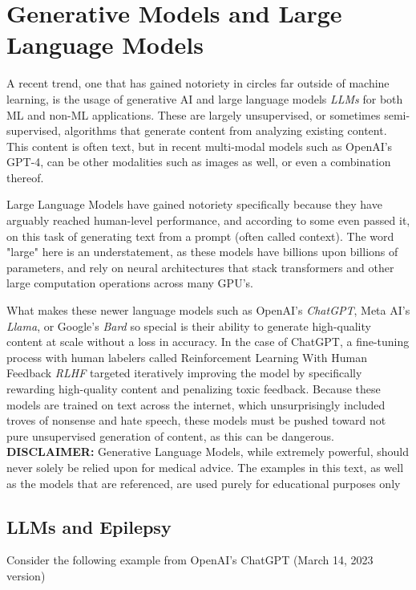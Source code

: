 
\section{Generative Models and Large Language Models}

A recent trend, one that has gained notoriety in circles far outside of machine learning, is the usage of generative AI
and large language models \textit{LLMs} for both ML and non-ML applications. These are largely unsupervised, or sometimes
semi-supervised, algorithms that generate content from analyzing existing content. This content is often text, but in recent
multi-modal models such as OpenAI's GPT-4\cite{openai2023gpt4}, can be other modalities such as images as well, or even a combination thereof.

Large Language Models have gained notoriety specifically because they have arguably reached human-level performance, and according
to some even passed it, on this task of generating text from a prompt (often called context). The word "large" here is an understatement,
as these models have billions upon billions of parameters, and rely on neural architectures that stack transformers and other large
computation operations across many GPU's.

What makes these newer language models such as OpenAI's \textit{ChatGPT}, Meta AI's \textit{Llama}, or Google's \textit{Bard} so special
is their ability to generate high-quality content at scale without a loss in accuracy. In the case of ChatGPT, a fine-tuning process with
human labelers called Reinforcement Learning With Human Feedback \textit{RLHF} targeted iteratively improving the model by specifically
rewarding high-quality content and penalizing toxic feedback. Because these models are trained on text across the internet, which
unsurprisingly included troves of nonsense and hate speech, these models must be pushed toward not pure unsupervised generation of content,
as this can be dangerous.
\\
\textbf{DISCLAIMER:} Generative Language Models, while extremely powerful, should never solely be relied upon for medical advice. The examples in this text,
as well as the models that are referenced, are used purely for educational purposes only

\subsection{LLMs and Epilepsy}

Consider the following example from OpenAI's ChatGPT (March 14, 2023 version)

